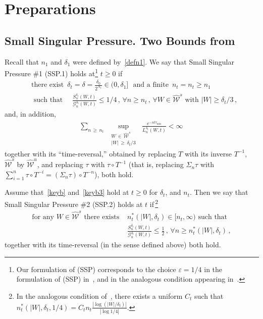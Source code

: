 \documentclass[AHL,Unicode,longabstracts,published]{cedram}
\newcommand{\cG}{\mathcal{G}}
\newcommand{\cW}{\mathcal{W}}
\newcommand{\hW}{\widehat{\cW}}
\newcommand{\ve}{\varepsilon}
\let\oldforall\forall
\renewcommand*{\forall}{\mathrel{\oldforall}}
\begin{document}
\section{Preparations}\label{boot}

\subsection{Small Singular Pressure. Two Bounds from~\cite{Ca}}\label{SSP}

Recall that $n_1$ and $\delta_1$ were defined by~\eqref{defn1}. We say that Small Singular Pressure \#1 (SSP.1) holds at\footnote{Our formulation of (SSP) corresponds to the choice $\ve=1/4$ in the formulation of (SSP) in~\cite{Ca}, and in the analogous condition appearing in~\cite[Corollary~5.3]{BD1}.} $t\ge 0$ if
\begin{equation}\label{keyb}
\begin{split}
&\text{there exist } \, \delta_t=\delta =\frac{\delta_0}{2^{N_t}}\in (0, \delta_1]\,\, \text{ and a finite } \, n_t=n_t
\ge n_1
\\
&\text{ such that }  \quad \frac{ S_n^{\delta_t}(W,t)} {\cG_n^{\delta_t}(W,t)} \le 1/4\,, \,
\forall n\ge n_t\,, \, \forall W \in \hW^s \text{ with } |W| \ge \delta_t/3\,,
\end{split}
\end{equation}
and, in addition,
\begin{align}\label{keyb3}
\sum_{n\,\ge\,n_t} \; \sup_{\substack{W\,\in\,\hW^s\\ |W|\,\ge\,\delta_t/3}}\,\,
\frac{e^{-nt \tau_{\min}} } { L^{\delta_t}_n(W,t)} < \infty \,
\end{align}
together with its ``time-reversal,'' obtained by replacing $T$ with its inverse $T^{-1}$, $\hW^s$ by $\hW^u$, and replacing $\tau$ with $\tau \circ T^{-1}$ (that is, replacing $\Sigma_n\tau$ with $\sum_{i=1}^n \tau \circ T^{-i}= (\Sigma_n \tau)\circ T^{-n}$), both hold.


Assume that~\eqref{keyb} and~\eqref{keyb3} hold at $t\ge 0$ for $\delta_t$, and $n_t$. Then we say that Small Singular Pressure \#2 (SSP.2) holds at $t$ if\,\footnote{In the analogous condition of~\cite[Corollary~5.3]{BD1}, there exists a uniform $C_t$ such that $n^*_t(|W|,\delta_t, 1/4)=C_t n_t\frac{|\log (|W|/\delta_{{t}})|}{|\log 1/4|}$.}
\begin{align}\label{keyb2}
\text{for any } W \in \hW^s \text{ there exists }& n^*_t(|W|,\delta_t) \in [n_t, \infty)
\text{ such that }\\
&\frac{ S_n^{\delta_t}(W,t)} {\cG_n^{\delta_t}(W,t)} \le \frac 1 2
\,, \, \forall n\ge n^*_t (|W|,\delta_t)\,,\nonumber
\end{align}
together with its time-reversal (in the sense defined above) both hold.
\end{document}
